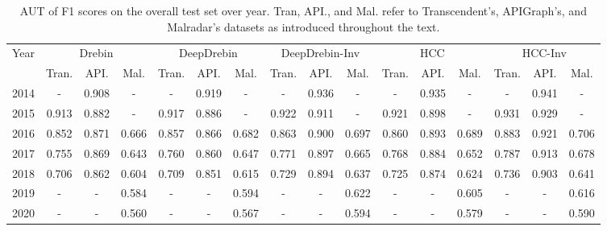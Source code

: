 \begin{table*}[htb]
\caption{AUT of F1 scores on the overall test set over year. Tran, API., and Mal. refer to Transcendent's, APIGraph's, and Malradar's datasets as introduced throughout the text.}
\label{tab: all}
\centering
\begin{tabular}{c|ccc|ccc|ccc|ccc|ccc}
\toprule
\multirow{2}{*}{Year} & \multicolumn{3}{c|}{Drebin} & \multicolumn{3}{c|}{DeepDrebin} & \multicolumn{3}{c|}{DeepDrebin-Inv} & \multicolumn{3}{c|}{HCC} & \multicolumn{3}{c}{HCC-Inv} \\ \cline{2-16}
& \multicolumn{1}{c|}{Tran.} & \multicolumn{1}{c|}{API.} & \multicolumn{1}{c|}{Mal.} & \multicolumn{1}{c|}{Tran.} & \multicolumn{1}{c|}{API.} & \multicolumn{1}{c|}{Mal.} & \multicolumn{1}{c|}{Tran.} & \multicolumn{1}{c|}{API.} & \multicolumn{1}{c|}{Mal.} & \multicolumn{1}{c|}{Tran.} & \multicolumn{1}{c|}{API.} & \multicolumn{1}{c|}{Mal.} & \multicolumn{1}{c|}{Tran.} & \multicolumn{1}{c|}{API.} & \multicolumn{1}{c}{Mal.} \\
\midrule
2014  & - & 0.908  & - 
      & - & 0.919  & - 
      & - & 0.936  & - 
      & - & 0.935  & - 
      & - & 0.941  & - \\ 
2015  & 0.913 & 0.882  & - 
      & 0.917 & 0.886  & - 
      & 0.922 & 0.911  & - 
      & 0.921 & 0.898  & - 
      & 0.931 & 0.929  & - \\ 
2016  & 0.852 & 0.871  & 0.666 
      & 0.857 & 0.866  & 0.682 
      & 0.863 & 0.900  & 0.697 
      & 0.860 & 0.893  & 0.689 
      & 0.883 & 0.921  & 0.706 \\ 
2017  & 0.755 & 0.869  & 0.643 
      & 0.760 & 0.860  & 0.647 
      & 0.771 & 0.897  & 0.665 
      & 0.768 & 0.884  & 0.652
      & 0.787 & 0.913  & 0.678\\ 
2018  & 0.706 & 0.862  & 0.604 
      & 0.709 & 0.851  & 0.615 
      & 0.729 & 0.894  & 0.637 
      & 0.725 & 0.874  & 0.624 
      & 0.736 & 0.903  & 0.641\\ 
2019  & - & -  & 0.584 
      & - & -  & 0.594 
      & - & -  & 0.622 
      & - & -  & 0.605 
      & - & -  & 0.616 \\ 
2020  & - & -  & 0.560 
      & - & -  & 0.567 
      & - & -  & 0.594
      & - & -  & 0.579 
      & - & -  & 0.590\\ 
                      
\bottomrule
\end{tabular}  
\end{table*}